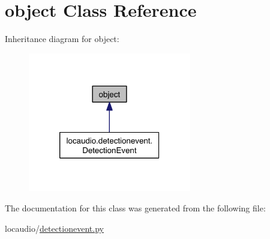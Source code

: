 \hypertarget{classobject}{\section{object Class Reference}
\label{classobject}
}


Inheritance diagram for object\-:\nopagebreak
\begin{figure}[H]
\begin{center}
\leavevmode
\includegraphics[width=202pt]{classobject__inherit__graph}
\end{center}
\end{figure}


The documentation for this class was generated from the following file\-:\begin{DoxyCompactItemize}
\item 
locaudio/\hyperlink{detectionevent_8py}{detectionevent.\-py}\end{DoxyCompactItemize}
